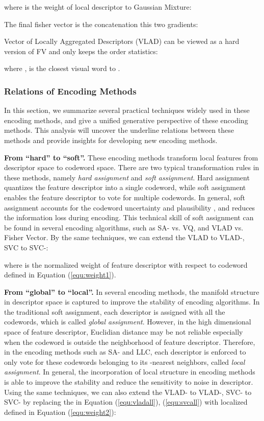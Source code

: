\documentclass[twocolumn]{svjour3}          \smartqed  \usepackage{slashbox}
\begin{document}
where  is the weight of local descriptor  to  Gaussian Mixture:

The final fisher vector is the concatenation this two gradients:

Vector of Locally Aggregated Descriptors (VLAD) \cite{JegouPDSPS12} can be viewed as a hard version of FV and only keeps the  order statistics:

where ,  is the closest visual word to .

\subsubsection{Relations of Encoding Methods}
\label{sec:relation}
In this section, we summarize several practical techniques widely used in these encoding methods, and give a unified generative perspective of these encoding methods. This analysis will uncover the underline relations between these methods and provide insights for developing new encoding methods.

\textbf{From ``hard'' to ``soft''.} These encoding methods transform local features from descriptor space to codeword space. There are two typical transformation rules in these methods, namely \emph{hard assignment} and \emph{soft assignment}. Hard assignment quantizes the feature descriptor into a single codeword, while soft assignment enables the feature descriptor to vote for multiple codewords. In general, soft assignment accounts for the codeword uncertainty and plausibility \cite{GemertVSG10}, and reduces the information loss during encoding. This technical skill of soft assignment can be found in several encoding algorithms, such as SA- vs. VQ, and VLAD vs. Fisher Vector. By the same techniques, we can extend the VLAD to VLAD-, SVC to SVC-:


where  is the normalized weight of feature descriptor  with respect to codeword  defined in Equation (\ref{equ:weight1}).

\textbf{From  ``global'' to ``local''.} In several encoding methods, the manifold structure in descriptor space is captured to improve the stability of encoding algorithms. In the traditional soft assignment, each descriptor is assigned with all the codewords, which is called \emph{global assignment}. However, in the high dimensional space of feature descriptor, Euclidian distance may be not reliable especially when the codeword is outside the neighborhood of feature descriptor. Therefore, in the encoding methods such as SA- and LLC, each descriptor is enforced to only vote for these codewords belonging to its -nearest neighbors, called \emph{local assignment}. In general, the incorporation of local structure in encoding methods is able to improve the stability and reduce the sensitivity to noise in descriptor. Using the same techniques, we can also extend the VLAD- to VLAD-, SVC- to SVC- by replacing the  in Equation (\ref{equ:vladall}), (\ref{equ:svcall}) with localized  defined in Equation (\ref{equ:weight2}):
\end{document}

